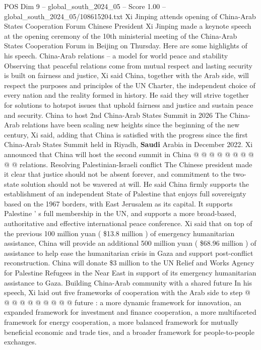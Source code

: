 \begin{textsample}{POS Dim 9 – global\_south\_2024\_05 – Score 1.00 – global\_south\_2024\_05/108615204.txt}  \label{ex:f9_pos_044}
Xi Jinping attends opening of China-Arab States Cooperation Forum Chinese President Xi Jinping made a keynote speech at the opening ceremony of the 10th ministerial meeting of the China-Arab States Cooperation Forum in Beijing on Thursday.
Here are some highlights of his speech.
China-Arab relations -- a model for world peace and stability Observing that peaceful relations come from mutual respect and lasting security is built on fairness and justice, Xi said China, together with the Arab side, will respect the purposes and principles of the UN Charter, the independent choice of every nation and the reality formed in history.
He said they will strive together for solutions to hotspot issues that uphold fairness and justice and sustain peace and security.
China to host 2nd China-Arab States Summit in 2026 The China-Arab relations have been scaling new heights since the beginning of the new century, Xi said, adding that China is satisfied with the progress since the first China-Arab States Summit held in Riyadh, \textbf{Saudi} Arabia in December 2022.
Xi announced that China will host the second summit in China @ @ @ @ @ @ @ @ @ @ relations.
Resolving Palestinian-Israeli conflict The Chinese president made it clear that justice should not be absent forever, and commitment to the two-state solution should not be wavered at will.
He said China firmly supports the establishment of an independent State of Palestine that enjoys full sovereignty based on the 1967 borders, with East Jerusalem as its capital.
It supports Palestine ' s full membership in the UN, and supports a more broad-based, authoritative and effective international peace conference.
Xi said that on top of the previous 100 million yuan ( \$13.8 million ) of emergency humanitarian assistance, China will provide an additional 500 million yuan ( \$68.96 million ) of assistance to help ease the humanitarian crisis in Gaza and support post-conflict reconstruction.
China will donate \$3 million to the UN Relief and Works Agency for Palestine Refugees in the Near East in support of its emergency humanitarian assistance to Gaza.
Building China-Arab community with a shared future In his speech, Xi laid out five frameworks of cooperation with the Arab side to step @ @ @ @ @ @ @ @ @ @ future : a more dynamic framework for innovation, an expanded framework for investment and finance cooperation, a more multifaceted framework for energy cooperation, a more balanced framework for mutually beneficial economic and trade ties, and a broader framework for people-to-people exchanges.

\end{textsample}

